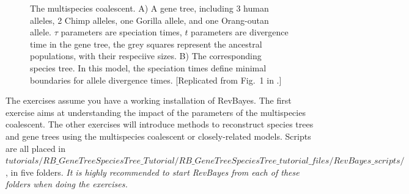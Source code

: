 \documentclass[11pt]{article}
\begin{document}
\begin{figure}[h!]
\centering
{}
\caption{\small The multispecies coalescent. A) A gene tree, including 3 human alleles, 2 Chimp alleles, one Gorilla allele, and one Orang-outan allele. $\tau$ parameters are speciation times, $t$ parameters are divergence time in the gene tree, the grey squares represent the ancestral populations, with their respeciive sizes.  B) The corresponding species tree. In this model, the speciation times define minimal boundaries for allele divergence times. [Replicated from Fig.~1 in \citet{Rannala2003a}.]}
\label{fig2}
\end{figure}

\vspace{20mm}

{\begin{framed}
\begin{center}
The exercises assume you have a working installation of RevBayes.
The first exercise aims at understanding the impact of the parameters of the multispecies coalescent.
The other exercises will introduce methods to reconstruct species trees and gene trees using the multispecies coalescent or closely-related models.
Scripts are all placed in {\footnotesize \emph{$tutorials/RB\_GeneTreeSpeciesTree\_Tutorial/RB\_GeneTreeSpeciesTree\_tutorial\_files/RevBayes\_scripts/$}}, in five folders. 
\emph{It is highly recommended to start RevBayes from each of these folders when doing the exercises.}
\end{center}
\end{framed}}
\vspace{5mm}
\end{document}
